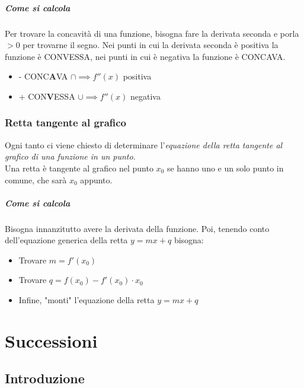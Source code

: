 \documentclass[12pt, a4paper, openany]{book}
\begin{document}
\paragraph*{Come si calcola}
Per trovare la concavità di una funzione, bisogna fare la derivata seconda e porla $>0$ per trovarne il segno.
Nei punti in cui la derivata seconda è positiva la funzione è CONVESSA, nei punti in cui è negativa la funzione è CONCAVA.

\begin{itemize}
	\item - CONC\textbf{A}VA $\cap \implies f''(x)$ positiva 
	\item + CON\textbf{V}ESSA $\cup \implies f''(x)$ negativa
\end{itemize}

\subsection*{Retta tangente al grafico}
Ogni tanto ci viene chiesto di determinare l'\emph{equazione della retta tangente al grafico di una funzione in un punto}.
\\Una retta è tangente al grafico nel punto $x_0$ se hanno uno e un solo punto in comune, che sarà $x_0$ appunto.

\paragraph{Come si calcola}
Bisogna innanzitutto avere la derivata della funzione. Poi, tenendo conto dell'equazione generica della retta $y=mx+q$ bisogna:
\begin{itemize}
	\item Trovare $m= f'(x_0)$
 \item Trovare $q = f(x_0)-f'(x_0) \cdot x_0$
 \item Infine, "monti" l'equazione della retta $y=mx+q$
\end{itemize}
\chapter{Successioni}

\section{Introduzione}
\end{document}

